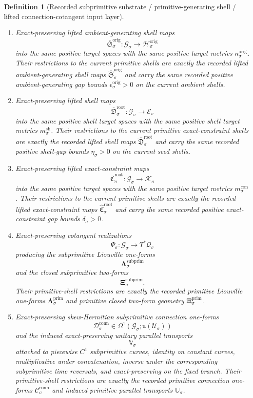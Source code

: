 \documentclass[11pt]{article}
\newcommand{\LieU}{\mathfrak u}
\newcommand{\RootClass}[1]{\mathscr U_{#1}}
\newcommand{\ConfigSpace}[1]{\mathcal Q_{#1}}
\newcommand{\ShellTarget}[1]{\mathcal E_{#1}}
\newcommand{\ShellMetric}[1]{m_{#1}^{\mathrm{sh}}}
\newcommand{\ShellGap}[1]{\eta_{#1}}
\newcommand{\ConstraintTarget}[1]{\mathcal K_{#1}}
\newcommand{\ConstraintMetric}[1]{m_{#1}^{\mathrm{con}}}
\newcommand{\ConstraintGap}[1]{\delta_{#1}}
\newcommand{\OriginTarget}[1]{\mathcal H_{#1}^{\mathrm{orig}}}
\newcommand{\OriginTargetMetric}[1]{n_{#1}^{\mathrm{orig}}}
\newcommand{\OriginGap}[1]{\epsilon_{#1}^{\mathrm{orig}}}
\newcommand{\PrimLiftedAmbient}[1]{\widehat{\mathfrak S}_{#1}^{\mathrm{orig}}}
\newcommand{\PrimLiftedShell}[1]{\widehat{\mathfrak D}_{#1}^{\mathrm{root}}}
\newcommand{\PrimConstraintMap}[1]{\widehat{\mathfrak C}_{#1}^{\mathrm{root}}}
\newcommand{\PrimLiouville}[1]{\boldsymbol{\Lambda}_{#1}^{\mathrm{prim}}}
\newcommand{\PrimTwo}[1]{\boldsymbol{\Xi}_{#1}^{\mathrm{prim}}}
\newcommand{\PrimConnectionForm}[1]{\mathcal C_{#1}^{\mathrm{conn}}}
\newcommand{\PrimTransport}[1]{\mathbb U_{#1}}
\newcommand{\SubprimSpace}[1]{\mathcal G_{#1}}
\newcommand{\SubprimLiftedAmbient}[1]{\overline{\mathfrak S}_{#1}^{\mathrm{orig}}}
\newcommand{\SubprimLiftedShell}[1]{\overline{\mathfrak D}_{#1}^{\mathrm{root}}}
\newcommand{\SubprimConstraintMap}[1]{\overline{\mathfrak C}_{#1}^{\mathrm{root}}}
\newcommand{\SubprimCotangentRealization}[1]{\overline{\Psi}_{#1}}
\newcommand{\SubprimLiouville}[1]{\boldsymbol{\Lambda}_{#1}^{\mathrm{subprim}}}
\newcommand{\SubprimTwo}[1]{\boldsymbol{\Xi}_{#1}^{\mathrm{subprim}}}
\newcommand{\SubprimConnectionForm}[1]{\mathcal D_{#1}^{\mathrm{conn}}}
\newcommand{\SubprimTransport}[1]{\mathbb V_{#1}}
\newtheorem{definition}{Definition}
\begin{document}
\begin{definition}[Recorded subprimitive substrate / primitive-generating shell / lifted connection-cotangent input layer]
\begin{enumerate}
    \item Exact-preserving lifted ambient-generating shell maps
    \[
    \SubprimLiftedAmbient{\sigma}:\SubprimSpace{\sigma}\to\OriginTarget{\sigma}
    \]
    into the same positive target spaces with the same positive target metrics \(\OriginTargetMetric{\sigma}\). Their restrictions to the current primitive shells are exactly the recorded lifted ambient-generating shell maps \(\PrimLiftedAmbient{\sigma}\) and carry the same recorded positive ambient-generating gap bounds \(\OriginGap{\sigma}>0\) on the current ambient shells.
    \item Exact-preserving lifted shell maps
    \[
    \SubprimLiftedShell{\sigma}:\SubprimSpace{\sigma}\to\ShellTarget{\sigma}
    \]
    into the same positive shell target spaces with the same positive shell target metrics \(\ShellMetric{\sigma}\). Their restrictions to the current primitive exact-constraint shells are exactly the recorded lifted shell maps \(\PrimLiftedShell{\sigma}\) and carry the same recorded positive shell-gap bounds \(\ShellGap{\sigma}>0\) on the current seed shells.
    \item Exact-preserving lifted exact-constraint maps
    \[
    \SubprimConstraintMap{\sigma}:\SubprimSpace{\sigma}\to\ConstraintTarget{\sigma}
    \]
    into the same positive target spaces with the same positive target metrics \(\ConstraintMetric{\sigma}\). Their restrictions to the current primitive shells are exactly the recorded lifted exact-constraint maps \(\PrimConstraintMap{\sigma}\) and carry the same recorded positive exact-constraint gap bounds \(\ConstraintGap{\sigma}>0\).
    \item Exact-preserving cotangent realizations
    \[
    \SubprimCotangentRealization{\sigma}:\SubprimSpace{\sigma}\to T^*\ConfigSpace{\sigma}
    \]
    producing the subprimitive Liouville one-forms
    \[
    \SubprimLiouville{\sigma}
    \]
    and the closed subprimitive two-forms
    \[
    \SubprimTwo{\sigma}.
    \]
    Their primitive-shell restrictions are exactly the recorded primitive Liouville one-forms \(\PrimLiouville{\sigma}\) and primitive closed two-form geometry \(\PrimTwo{\sigma}\).
    \item Exact-preserving skew-Hermitian subprimitive connection one-forms
    \[
    \SubprimConnectionForm{\sigma}\in \Omega^1(\SubprimSpace{\sigma};\LieU(\RootClass{\sigma}))
    \]
    and the induced exact-preserving unitary parallel transports
    \[
    \SubprimTransport{\sigma}
    \]
    attached to piecewise \(C^1\) subprimitive curves, identity on constant curves, multiplicative under concatenation, inverse under the corresponding subprimitive time reversals, and exact-preserving on the fixed branch. Their primitive-shell restrictions are exactly the recorded primitive connection one-forms \(\PrimConnectionForm{\sigma}\) and induced primitive parallel transports \(\PrimTransport{\sigma}\).

\end{enumerate}
\end{definition}
\end{document}
